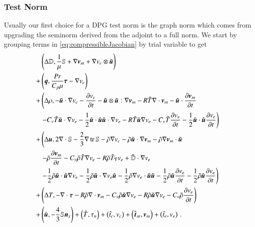 \documentclass[preprint,12pt]{elsarticle}
\begin{document}
\subsubsection{Test Norm}
Usually our first choice for a DPG test norm is the graph norm which comes from upgrading the seminorm derived from the 
adjoint to a full norm.
We start by grouping terms in \eqref{eq:compressibleJacobian} by trial variable to get
\begin{equation}
\begin{aligned}
&\left( \Delta\mathbb{D},\frac{1}{\mu}\mathbb{S}+\nabla\boldsymbol v_m+\nabla v_e\otimes\tilde{\boldsymbol u} \right)\\
+&\left( \boldsymbol q,\frac{Pr}{C_p\mu}\boldsymbol\tau-\nabla v_e \right)\\
+&\left(\Delta\rho,-\tilde{\boldsymbol u}\cdot\nabla v_c-\frac{\partial v_c}{\partial t}
-\tilde{\boldsymbol u}\otimes\tilde{\boldsymbol u}:\nabla\boldsymbol v_m
-R\tilde T\nabla\cdot\boldsymbol v_m-\tilde{\boldsymbol u}\cdot\frac{\partial\boldsymbol v_m}{\partial t}\right.\\
&\left.-C_v\tilde T\tilde{\boldsymbol u}\cdot\nabla v_e-\frac{1}{2}\tilde{\boldsymbol u}\cdot\tilde{\boldsymbol u}\tilde{\boldsymbol u}\cdot\nabla v_e
-R\tilde T\tilde{\boldsymbol u}\nabla v_e
-C_v\tilde T\frac{\partial v_e}{\partial t}-\frac{1}{2}\tilde{\boldsymbol u}\cdot\tilde{\boldsymbol u}\frac{\partial v_e}{\partial t}
\right)\\
+&\left(\Delta\boldsymbol u,2\nabla\cdot\mathbb{S}-\frac{2}{3}\nabla\operatorname*{tr}{\mathbb{S}}
-\tilde\rho\nabla v_c
-\tilde\rho\tilde{\boldsymbol u}\cdot\nabla\boldsymbol v_m-\tilde\rho\nabla\boldsymbol v_m\cdot\tilde{\boldsymbol u}
\right.\\
&\left.
-\tilde\rho\frac{\partial\boldsymbol v_m}{\partial t}
-C_v\tilde\rho\tilde T\nabla v_e
-R\tilde\rho\tilde T_{\nabla} v_e
+\tilde{\mathbb{D}}\cdot\nabla v_e
\right.\\
&\left.
-\frac{1}{2}\tilde\rho\tilde{\boldsymbol u}\cdot\tilde{\boldsymbol u}\nabla v_e
-\frac{1}{2}\tilde\rho\tilde{\boldsymbol u}\cdot\nabla v_e\tilde{\boldsymbol u}
-\frac{1}{2}\tilde\rho\nabla v_e\cdot\tilde{\boldsymbol u}\tilde{\boldsymbol u}
-\frac{1}{2}\tilde\rho\tilde{\boldsymbol u}\frac{\partial v_e}{\partial t}
-\frac{1}{2}\tilde\rho\tilde{\boldsymbol u}\frac{\partial v_e}{\partial t}
\right)\\
+&\left(\Delta T,-\nabla\cdot\boldsymbol\tau
-R\tilde\rho\nabla\cdot\boldsymbol v_m
-C_v\tilde\rho\tilde{\boldsymbol u}\nabla v_e
-R\tilde\rho\tilde{\boldsymbol u}\nabla v_e
-C_v\tilde\rho\frac{\partial v_e}{\partial t}
\right)\\
+&\left( \hat{\boldsymbol u},-\frac{4}{3}\mathbb{S}\boldsymbol n_x \right)
+\left( \hat T,\tau_n \right)
+\left( \hat t_c,v_c \right)
+\left( \hat{\boldsymbol t}_m,\boldsymbol v_m \right)
+\left( \hat t_e,v_e \right)\,.
\end{aligned}	
\end{equation}
\end{document}
